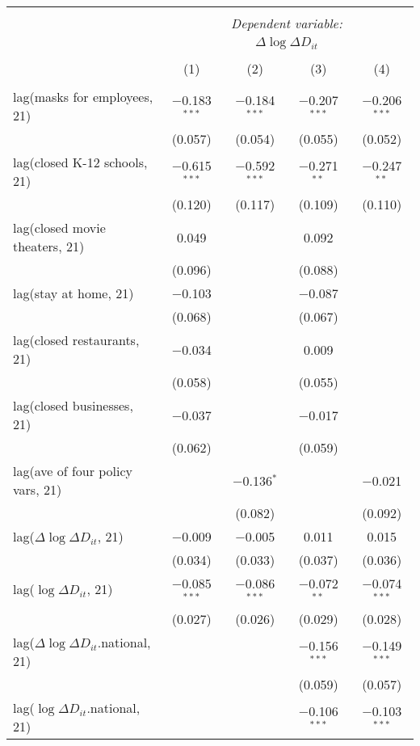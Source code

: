 \begin{tabular}{@{\extracolsep{1pt}}lcccc} 
\\[-1.8ex]\hline 
\hline \\[-1.8ex] 
 & \multicolumn{4}{c}{\textit{Dependent variable:}} \\ 
\cline{2-5} 
 & \multicolumn{4}{c}{$\Delta \log \Delta D_{it}$} \\ 
\\[-1.8ex] & (1) & (2) & (3) & (4)\\ 
\hline \\[-1.8ex] 
 lag(masks for employees, 21) & $-$0.183$^{***}$ & $-$0.184$^{***}$ & $-$0.207$^{***}$ & $-$0.206$^{***}$ \\ 
  & (0.057) & (0.054) & (0.055) & (0.052) \\ 
  lag(closed K-12 schools, 21) & $-$0.615$^{***}$ & $-$0.592$^{***}$ & $-$0.271$^{**}$ & $-$0.247$^{**}$ \\ 
  & (0.120) & (0.117) & (0.109) & (0.110) \\ 
  lag(closed movie theaters, 21) & 0.049 &  & 0.092 &  \\ 
  & (0.096) &  & (0.088) &  \\ 
  lag(stay at home, 21) & $-$0.103 &  & $-$0.087 &  \\ 
  & (0.068) &  & (0.067) &  \\ 
  lag(closed restaurants, 21) & $-$0.034 &  & 0.009 &  \\ 
  & (0.058) &  & (0.055) &  \\ 
  lag(closed businesses, 21) & $-$0.037 &  & $-$0.017 &  \\ 
  & (0.062) &  & (0.059) &  \\ 
  lag(ave of four policy vars, 21) &  & $-$0.136$^{*}$ &  & $-$0.021 \\ 
  &  & (0.082) &  & (0.092) \\ 
  lag($\Delta \log \Delta D_{it}$, 21) & $-$0.009 & $-$0.005 & 0.011 & 0.015 \\ 
  & (0.034) & (0.033) & (0.037) & (0.036) \\ 
  lag($\log \Delta D_{it}$, 21) & $-$0.085$^{***}$ & $-$0.086$^{***}$ & $-$0.072$^{**}$ & $-$0.074$^{***}$ \\ 
  & (0.027) & (0.026) & (0.029) & (0.028) \\ 
  lag($\Delta \log \Delta D_{it}$.national, 21) &  &  & $-$0.156$^{***}$ & $-$0.149$^{***}$ \\ 
  &  &  & (0.059) & (0.057) \\ 
  lag($\log \Delta D_{it}$.national, 21) &  &  & $-$0.106$^{***}$ & $-$0.103$^{***}$ \\ 

\end{tabular}
